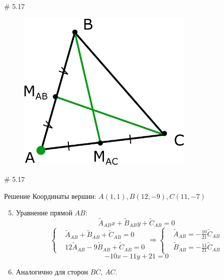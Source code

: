 \documentclass[russian]{beamer}
\begin{document}
    
  \begin{frame}{\# 5.17}
    \begin{figure}
      \centering
      \includegraphics[width=0.75\textwidth]{5-17}
    \end{figure}
  \end{frame}
    
    
  \begin{frame}{\# 5.17}
    \begin{block}{Решение}
      Координаты вершин: $A(1, 1), B(12, -9), C(11, -7)$
      
      \pause
      
      \begin{enumerate}
        \setcounter{enumi}{4}
        
        \item Уравнение прямой $AB$:
        \[
          \widetilde A_{AB} x + \widetilde B_{AB} y + \widetilde C_{AB} = 0
        \]
        \[
          \left\{
            \begin{aligned}
              &\widetilde A_{AB} + \widetilde B_{AB} + \widetilde C_{AB} = 0\\
              &12 \widetilde A_{AB} -9 \widetilde B_{AB} + \widetilde C_{AB} = 0
            \end{aligned}
          \right.
          \Rightarrow
          \left\{
            \begin{aligned}
              &\widetilde A_{AB} = -\frac{10}{21}\widetilde C_{AB}\\
              &\widetilde B_{AB} = -\frac{11}{21}\widetilde C_{AB}
            \end{aligned}
          \right.
        \]
        \[
          -10x - 11y + 21 = 0
        \]
        
        \item Аналогично для сторон $BC$, $AC$.
      \end{enumerate}
    \end{block}
  \end{frame}
    
\end{document}
